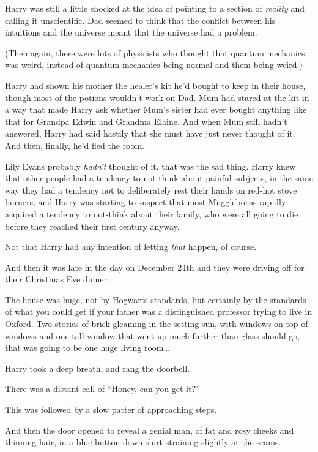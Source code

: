 Harry was still a little shocked at the idea of pointing to a section of \emph{reality} and calling it unscientific. Dad seemed to think that the conflict between his intuitions and the universe meant that the universe had a problem.

(Then again, there were lots of physicists who thought that quantum mechanics was weird, instead of quantum mechanics being normal and them being weird.)

Harry had shown his mother the healer’s kit he’d bought to keep in their house, though most of the potions wouldn’t work on Dad. Mum had stared at the kit in a way that made Harry ask whether Mum’s sister had ever bought anything like that for Grandpa Edwin and Grandma Elaine. And when Mum still hadn’t answered, Harry had said hastily that she must have just never thought of it. And then, finally, he’d fled the room.

Lily Evans probably \emph{hadn’t} thought of it, that was the sad thing. Harry knew that other people had a tendency to not-think about painful subjects, in the same way they had a tendency not to deliberately rest their hands on red-hot stove burners; and Harry was starting to suspect that most Muggleborns rapidly acquired a tendency to not-think about their family, who were all going to die before they reached their first century anyway.

Not that Harry had any intention of letting \emph{that} happen, of course.

And then it was late in the day on December 24th and they were driving off for their Christmas Eve dinner.

\later

The house was huge, not by Hogwarts standards, but certainly by the standards of what you could get if your father was a distinguished professor trying to live in Oxford. Two stories of brick gleaming in the setting sun, with windows on top of windows and one tall window that went up much further than glass should go, that was going to be one huge living room…

Harry took a deep breath, and rang the doorbell.

There was a distant call of “Honey, can you get it?”

This was followed by a slow patter of approaching steps.

And then the door opened to reveal a genial man, of fat and rosy cheeks and thinning hair, in a blue button-down shirt straining slightly at the seams.

